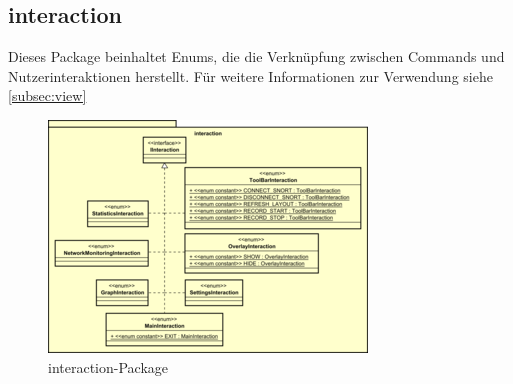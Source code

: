 \subsection{interaction}
\label{subsec:interaction}

Dieses Package beinhaltet Enums, die die Verknüpfung zwischen Commands und Nutzerinteraktionen herstellt.
Für weitere Informationen zur Verwendung siehe \ref{subsec:view}

\begin{figure}[H]
  \centering
  \includegraphics[width=\textwidth]{../diagramimages/interaction.png}
  \caption{interaction-Package}
\end{figure} 